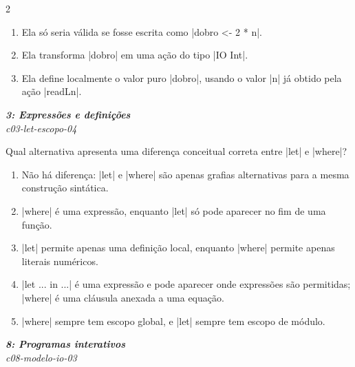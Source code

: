 \documentclass[a4paper,10pt,brazil]{article}
\begin{document}
\begin{multicols}{2}
\begin{enumerate}
  \item Ela só seria válida se fosse escrita como \haskellinline|dobro <- 2 * n|.

  \item Ela transforma \haskellinline|dobro| em uma ação do tipo \haskellinline|IO Int|.

  \item Ela define localmente o valor puro \haskellinline|dobro|, usando o valor \haskellinline|n| já obtido pela ação \haskellinline|readLn|.


\end{enumerate}

\begin{flushright}
  \footnotesize
  \textit{\textbf{3: Expressões e definições}}\\
  \textit{c03-let-escopo-04}\\

\end{flushright}
Qual alternativa apresenta uma diferença conceitual correta entre \haskellinline|let| e \haskellinline|where|?

\begin{enumerate}
  \item Não há diferença: \haskellinline|let| e \haskellinline|where| são apenas grafias alternativas para a mesma construção sintática.

  \item \haskellinline|where| é uma expressão, enquanto \haskellinline|let| só pode aparecer no fim de uma função.

  \item \haskellinline|let| permite apenas uma definição local, enquanto \haskellinline|where| permite apenas literais numéricos.

  \item \haskellinline|let ... in ...| é uma expressão e pode aparecer onde expressões são permitidas; \haskellinline|where| é uma cláusula anexada a uma equação.

  \item \haskellinline|where| sempre tem escopo global, e \haskellinline|let| sempre tem escopo de módulo.


\end{enumerate}

\begin{flushright}
  \footnotesize
  \textit{\textbf{8: Programas interativos}}\\
  \textit{c08-modelo-io-03}\\


\end{flushright}
\end{multicols}
\end{document}
